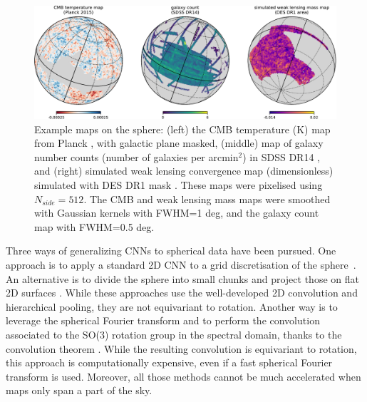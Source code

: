 \documentclass[final,twocolumn,3p,times,sort&compress]{elsarticle}
\newcommand{\1}{\b{1}}              %
\newcommand{\0}{\b{0}}              %
\begin{document}
\begin{figure}
\includegraphics[width=\linewidth]{figure_example_maps}
\caption{Example maps on the sphere:
(left) the CMB temperature (K) map from Planck \citep{planck2015overview}, with galactic plane masked,
(middle) map of galaxy number counts (number of galaxies per arcmin$^2$) in SDSS DR14 \citep{abolfathi2017sdssDR14},
and (right) simulated weak lensing convergence map (dimensionless) simulated with DES DR1 mask \citep{des2018dr1}.
These maps were pixelised using $N_{side} = 512$.
The CMB and weak lensing mass maps were smoothed with Gaussian kernels with FWHM=1 deg, and the galaxy count map with FWHM=0.5 deg.
}
\label{fig:example_maps}
\end{figure}

Three ways of generalizing CNNs to spherical data have been pursued.
One approach is to apply a standard 2D CNN to a grid discretisation of the sphere~\citep{boomsma2017spherical,su2017sphericalconv,coors2018spherenet}.
An alternative is to divide the sphere into small chunks and project those on flat 2D surfaces \citep{fluri2018deep,gupta2018nongaussianinformation,schmelze2017cosmologicalmodel,gillet2018deeplearning}.
While these approaches use the well-developed 2D convolution and hierarchical pooling, they are not equivariant to rotation.
Another way is to leverage the spherical Fourier transform and to perform the convolution associated to the SO(3) rotation group in the spectral domain, thanks to the convolution theorem \citep{cohen2018sphericalcnn, esteves2017sphericalcnn}.
While the resulting convolution is equivariant to rotation, this approach is computationally expensive, even if a fast spherical Fourier transform is used.
Moreover, all those methods cannot be much accelerated when maps only span a part of the sky.
\end{document}
